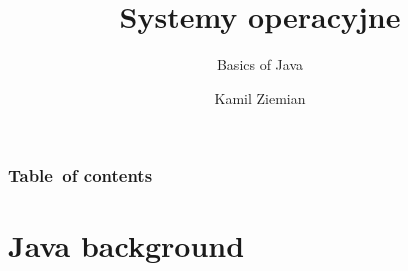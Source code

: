 \documentclass[10pt,t]{beamer}
\title{Systemy operacyjne}
\subtitle{Basics of Java}
\author{Kamil Ziemian \\
  \email}
\begin{document}





\RaggedRight





\maketitle





\begin{frame}
  \frametitle{Table~of contents}


  \tableofcontents

\end{frame}




















\section{Java background}
\end{document}
